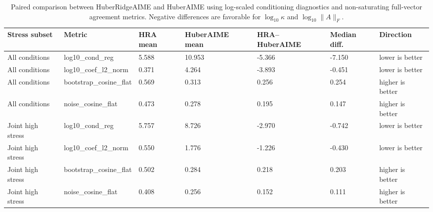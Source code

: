 \begin{table}
\caption{Paired comparison between HuberRidgeAIME and HuberAIME using log-scaled conditioning diagnostics and non-saturating full-vector agreement metrics. Negative differences are favorable for $\log_{10}\kappa$ and $\log_{10}\|A\|_F$.}
\label{tab:revision_log_conditioning_hra_vs_huberaime}
\begin{tabular}{lllllll}
\toprule
Stress subset & Metric & HRA mean & HuberAIME mean & HRA--HuberAIME & Median diff. & Direction \\
\midrule
All conditions & log10\_cond\_reg & 5.588 & 10.953 & -5.366 & -7.150 & lower is better \\
All conditions & log10\_coef\_l2\_norm & 0.371 & 4.264 & -3.893 & -0.451 & lower is better \\
All conditions & bootstrap\_cosine\_flat & 0.569 & 0.313 & 0.256 & 0.254 & higher is better \\
All conditions & noise\_cosine\_flat & 0.473 & 0.278 & 0.195 & 0.147 & higher is better \\
Joint high stress & log10\_cond\_reg & 5.757 & 8.726 & -2.970 & -0.742 & lower is better \\
Joint high stress & log10\_coef\_l2\_norm & 0.550 & 1.776 & -1.226 & -0.430 & lower is better \\
Joint high stress & bootstrap\_cosine\_flat & 0.502 & 0.284 & 0.218 & 0.203 & higher is better \\
Joint high stress & noise\_cosine\_flat & 0.408 & 0.256 & 0.152 & 0.111 & higher is better \\
\bottomrule
\end{tabular}
\end{table}

